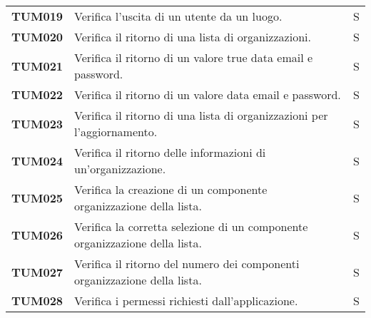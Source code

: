 \documentclass[../../piano-di-qualifica.tex]{subfiles}
\begin{document}
\begin{longtable}[H]{>{\centering\bfseries}m{3cm} >{}m{10cm} >{\centering\arraybackslash}m{3cm}}
  TUM019             & Verifica l'uscita di un utente da un luogo.                                                                         & S                             \\ %

  TUM020             & Verifica il ritorno di una lista di organizzazioni.                                                                 & S                             \\ %


  TUM021             & Verifica il ritorno di un valore true data email e password.                                                        & S                             \\ %

  TUM022             & Verifica il ritorno di un valore data email e password.                                                             & S                             \\ %

  TUM023             & Verifica il ritorno di una lista di organizzazioni per l'aggiornamento.                                             & S                             \\ %

  TUM024             & Verifica il ritorno delle informazioni di un'organizzazione.                                                        & S                             \\ %

  TUM025             & Verifica la creazione di un componente organizzazione della lista.                                                  & S                             \\ %

  TUM026             & Verifica la corretta selezione di un componente organizzazione della lista.                                         & S                             \\ %

  TUM027             & Verifica il ritorno del numero dei componenti organizzazione della lista.                                           & S                             \\ %

  TUM028             & Verifica i permessi richiesti dall'applicazione.                                                                    & S                             \\ %



\end{longtable}
\end{document}
